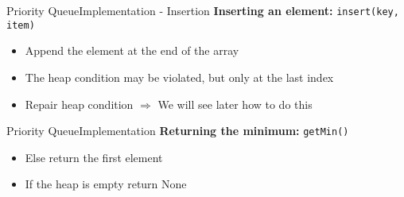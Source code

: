 \begin{frame}{Priority Queue}{Implementation - Insertion}
  \textbf{Inserting an element:}
         {\color{Mittel-Blau}\texttt{insert(key, item)}}
           \begin{figure}[!h]
    \begin{adjustbox}{height=0.275\linewidth}
    \end{adjustbox}
    \hspace{-1.5em}
    \begin{adjustbox}{height=0.275\linewidth}
    \end{adjustbox}
    \label{fig:priority_queue:impl_insert}%
  \end{figure}%
  \begin{itemize}
    \item<2->
      Append the element at the end of the array
    \item<3->
      The {\color{Mittel-Blau}heap condition} may be violated, but only at the
      last index
    \item<4->
      Repair {\color{Mittel-Blau}heap condition}
      $\Rightarrow$ We will see later how to do this
  \end{itemize}
\end{frame}


\begin{frame}{Priority Queue}{Implementation}
  \textbf{Returning the minimum:}
         {\color{Mittel-Blau}\texttt{getMin()}}
          \begin{figure}[!h]
    \begin{adjustbox}{height=0.275\linewidth}
    \end{adjustbox}
    \hspace{1.75em}
    \hfill
    \label{fig:priority_queue:impl_peek}%
  \end{figure}%
  \begin{itemize}
    \item<2->
      Else return the first element
    \item<3->
      If the heap is empty return {\color{Mittel-Blau}None}
  \end{itemize}
\end{frame}

